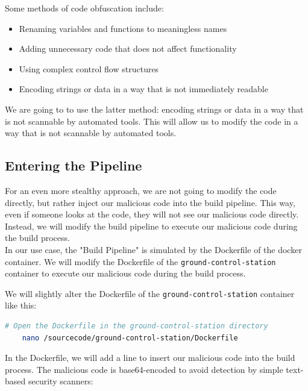 \documentclass[12pt]{scrartcl}
\begin{document}
    Some methods of code obfuscation include:
    \begin{itemize}
        \item Renaming variables and functions to meaningless names
        \item Adding unnecessary code that does not affect functionality
        \item Using complex control flow structures
        \item Encoding strings or data in a way that is not immediately readable
    \end{itemize}
    \noindent
    We are going to to use the latter method: encoding strings or data in a way that is not scannable by automated tools.
    This will allow us to modify the code in a way that is not scannable by automated tools.

    \newpage

    \subsection{Entering the Pipeline}

    \noindent
    For an even more stealthy approach, we are not going to modify the code directly, but rather inject our malicious code into the build pipeline. 
    This way, even if someone looks at the code, they will not see our malicious code directly. Instead, we will modify the build pipeline to execute our malicious code during the build process. \\
    \noindent
    In our use case, the "Build Pipeline" is simulated by the Dockerfile of the docker container. We will modify the Dockerfile of the \texttt{ground-control-station} container to execute our malicious code during the build process.
    
    \noindent
    We will slightly alter the Dockerfile of the \texttt{ground-control-station} container like this:
    \begin{lstlisting}[language=bash, caption=Modifying the Dockerfile]
    # Open the Dockerfile in the ground-control-station directory
    nano /sourcecode/ground-control-station/Dockerfile
    \end{lstlisting}
    
    \noindent
    In the Dockerfile, we will add a line to insert our malicious code into the build process. The malicious code is base64-encoded to avoid detection by simple text-based security scanners:
    
\end{document}
